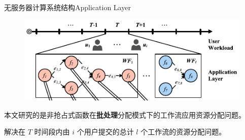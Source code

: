 \documentclass[aspectratio=169]{beamer}
\begin{document}
\begin{frame}{无服务器计算系统结构}{Application Layer}
  \begin{figure}
    \centering
    \includegraphics[height=0.6\textheight]{img/serverless-system-architecture/system-model-application.pdf}
  \end{figure}

  本文研究的是非抢占式函数在\textbf{批处理}分配模式下的工作流应用资源分配问题。

  解决在 $T$ 时间段内由 $i$ 个用户提交的总计 $l$ 个工作流的资源分配问题。
\end{frame}
\end{document}

